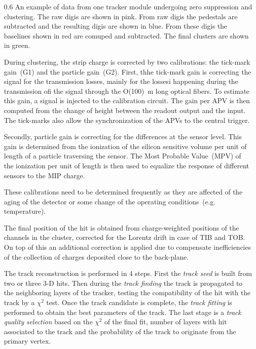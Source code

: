                  {0.6}       %
                 {An example of data from one tracker module undergoing zero suppression and clustering. The raw digis are shown in pink. From raw digis the pedestals are subtracted and the resulting digis are shown in blue. From these digis the baselines shown in red are comuped and subtracted. The final clusters are shown in green.} %

During clustering, the strip charge is corrected by two calibrations: the tick-mark gain~(G1) and the particle gain~(G2). First, thhe tick-mark gain is correcting the signal for the transmission losses, mainly for the lossesi happening during the transmission ofi the signal through the O(100)~m long optical fibers. To estimate this gain, a signal is injected to the calibration circuit. The gain per APV is then computed from the change of height between the readout output and the input. The tick-marks also allow the synchronization of the APVs to the central trigger.

Secondly, particle gain is correcting for the differences at the sensor level. This gain is determined from the ionization of the silicon sensitive volume per unit of length of a particle traversing the sensor. The Most Probable Value~(MPV) of the ionization per unit of length is then used to equalize the response of different sensors to the MIP charge. 

These calibrations need to be determined frequently as they are affected of the aging of the detector or some change of the operating conditions~(e.g. temperature).

The final position of the hit is obtained from charge-weighted positions of the channels in the cluster, corrected for the Lorentz drift in case of TIB and TOB. On top of this an additional correction is applied due to compensate inefficiencies of the collection of charges deposited close to the back-plane. 

The track reconstruction is performed in 4 steps. First the \textit{track seed} is built from two or three 3-D hits. Then during the \textit{track finding} the track is propagated to the neighboring layers of the tracker, testing the compatibility of the hit with the track by a $\chi^{2}$ test. Once the track candidate is complete, the \textit{track fitting} is performed to obtain the best parameters of the track. The last stage is a \textit{track quality selection} based on the $\chi^{2}$ of the final fit, number of layers with hit associated to the track and the probability of the track  to originate from the primary vertex.

